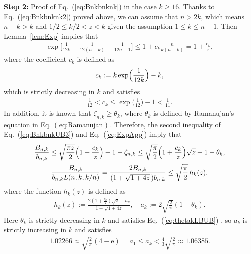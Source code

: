 \documentclass[aop]{imsart}
\theoremstyle{plain}
\theoremstyle{remark}
\newcommand{\rme}{\mathrm{e}}
\newcommand{\1}{\operatorname{\uppercase\expandafter{\romannumeral1}}}
\newcommand{\2}{\operatorname{\uppercase\expandafter{\romannumeral2}}}
\newcommand{\3}{\operatorname{\uppercase\expandafter{\romannumeral3}}}
\newcommand{\4}{\operatorname{\uppercase\expandafter{\romannumeral4}}}
\newcommand{\5}{\operatorname{\uppercase\expandafter{\romannumeral5}}}
\newcommand{\6}{\operatorname{\uppercase\expandafter{\romannumeral6}}}
\newcommand{\7}{\operatorname{\uppercase\expandafter{\romannumeral7}}}
\newcommand{\8}{\operatorname{\uppercase\expandafter{\romannumeral8}}}
\newcommand{\9}{\operatorname{\uppercase\expandafter{\romannumeral9}}}
\newcommand{\eref}[1]{Eq.~\textup{(\ref{#1})}}
\newcommand{\lref}[1]{Lemma~\ref{#1}}
\begin{document}
\begin{appendix}
\textbf{Step 2:} Proof of \eref{eq:Bnkbnknk} in the case $k\geq 16$. Thanks to \eref{eq:Bnkbnknk2} proved above, we can assume that $n> 2k$, which means $n-k> k$ and $1/2\leq k/2< z< k$ given the assumption $1\leq k\leq n-1$. 	
 Then \lref{lem:Exp} implies that 
	\begin{align}\label{eq:ExpApp}
	\exp\biggl[\frac{1}{12 k}+\frac{1}{12(n-k)}-\frac{1}{12n+1}\biggr]\leq 1+c_k\frac{n}{k(n-k)}=1+\frac{c_k}{z},
	\end{align}
	where the coefficient $c_k$ is defined as
	\begin{align}
	c_k :=k\exp\Bigl(\frac{1}{12 k}\Bigr)-k,
	\end{align}
which is strictly decreasing in $k$ and satisfies 
	\begin{align}
	\frac{1}{12}<c_k \leq \exp\biggl(\frac{1}{12 }\biggr)-1<\frac{1}{11}.
	\end{align}
	In addition, it is known that $\zeta_{n,k}\geq \theta_k $, where $\theta_k$ is defined by Ramanujan's equation in \eref{eq:Ramanujan}  \cite{JogdS68}.
	Therefore, the second inequality of \eref{eq:BnkbnkUB3} and \eref{eq:ExpApp} imply that
	\begin{gather}
	\frac{B_{n,k}}{b_{n,k}}\leq \sqrt{\frac{\pi z}{2}}\Bigl(1+\frac{c_k}{z}\Bigr)+1-\zeta_{n,k}
	\leq \sqrt{\frac{\pi}{2}}\Bigl(1+\frac{c_k}{z}\Bigr)\sqrt{z}+1-\theta_k,\\
	\frac{B_{n,k}}{ b_{n,k}L(n,k,k/n)}=\frac{2B_{n,k}}{(1+\sqrt{1+4z}\,) b_{n,k}}
	\leq \sqrt{\frac{\pi}{2}}\, h_k(z),
	\end{gather}
	where the function $h_k(z)$ is defined as
	\begin{align}
	h_k(z):=\frac{2(1+\frac{c_k}{z})\sqrt{z} +a_k }{1+\sqrt{1+4z}},\quad 
	a_k:=2\sqrt{\frac{2}{\pi}}(1-\theta_k).
	\end{align}
Here $\theta_k$  is strictly decreasing in $k$ and satisfies \eref{eq:thetakLBUB} \cite{Szeg28,Wats29}, so 	 $a_k$ is strictly increasing in $k$ and satisfies
	\begin{align}
	1.02266\approx \sqrt{\frac{2}{\pi}}(4-\rme)=a_1\leq a_k< \frac{4}{3}\sqrt{\frac{2}{\pi}}\approx 1.06385.
	\end{align}
	

\end{appendix}
\end{document}

